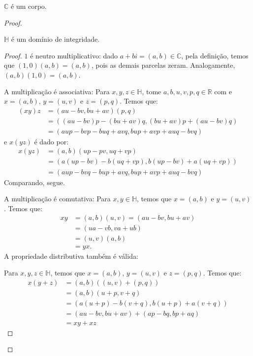 \begin{prop}
    $\mathbb C$ é um corpo.
\end{prop}
\begin{proof}
    \begin{prop}
        $\mathbb H$ é um domínio de integridade.
    \end{prop}
    \begin{proof}
        $1$ é neutro multiplicativo: dado $a+bi=(a, b)\in \mathbb C$, pela definição, temos que $(1, 0)(a, b)=(a, b)$, pois as demais parcelas zeram. Analogamente, $(a, b)(1, 0)=(a, b)$.
        
        A multiplicação é associativa:
        Para $x, y, z \in \mathbb H$, tome $a, b, u, v, p, q \in \mathbb R$ com e $x=(a, b)$, $y=(u, v)$ e $z=(p, q)$.
        Temos que:
        \begin{align*}
            (xy)z &=(au-bv, bu+av)(p, q)\\
            &=((au-bv)p-(bu+av)q, (bu+av)p+(au-bv)q)\\
            &=(aup-bvp-buq+avq, bup+avp+auq-bvq)
        \end{align*}
        e $x(yz)$ é dado por:
        \begin{align*}
        x(yz) &=(a, b)(up-pv,uq+vp)\\
        &=(a(up-bv)-b(uq+vp), b(up-bv)+a(uq+vp))\\
        &=(aup-bvq-bup+avq, bup+avp+auq-bvq)
        \end{align*}
        Comparando, segue.

        A multiplicação é comutativa: Para $x, y \in \mathbb H$, temos que $x=(a, b)$ e $y=(u, v)$. Temos que:
        \begin{align*}
            xy &=(a, b)(u, v)
            =(au-bv, bu+av)\\
            &= (ua-vb, va+ub)\\
            &= (u, v)(a, b)\\
            &=yx.
        \end{align*}    
        A propriedade distributiva também é válida:

        Para $x, y, z \in \mathbb H$, temos que $x=(a, b)$, $y=(u, v)$ e $z=(p, q)$. Temos que:
        \begin{align*}
            x(y+z) &=(a, b)((u, v)+(p, q))\\
            &=(a, b)(u+p, v+q)\\
            &=(a(u+p)-b(v+q), b(u+p)+a(v+q))\\
            &=(au-bv, bu+av)+(ap-bq, bp+aq)\\
            &=xy+xz
        \end{align*}


\end{proof}
\end{proof}
